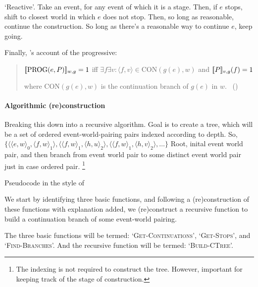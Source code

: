 \begin{note}
  `Reactive'.
  Take an event, for any event of which it is a stage.
  Then, if \(e\) stops, shift to closest world in which \(e\) does not stop.
  Then, so long as reasonable, continue the construction.
  So long as there's a reasonable way to continue \(e\), keep going.
\end{note}

\begin{note}
  Finally, \citeauthor{Landman:1992wh}'s account of the progressive:
  \begin{quote}
    \(\sem{\text{PROG}(e, P)}_{w,g} = 1\) iff \(\exists f \exists v\colon \langle f,v \rangle \in \text{CON}(g(e), w)\)\newline
    \phantom{an} and \(\sem{P}_{v,g}(f) = 1\)\par

    where \(\text{CON}(g(e), w)\) is the continuation branch of \(g(e)\) in \(w\).\newline
        \mbox{ }\hfill\mbox{(\citeyear[27]{Landman:1992wh})}
  \end{quote}
\end{note}

\paragraph{Algorithmic (re)construction}

\begin{note}
  Breaking this down into a recursive algorithm.
  Goal is to create a tree, which will be a set of ordered event-world-pairing pairs indexed according to depth.
  So, \(\{\langle \langle e,w \rangle_{0}, \langle f,w \rangle_{1} \rangle, \langle \langle f,w \rangle_{1}, \langle h,u \rangle_{2} \rangle, \langle \langle f,w \rangle_{1}, \langle h,v \rangle_{2} \rangle, \dots \}\)
  Root, inital event world pair, and then branch from event world pair to some distinct event world pair just in case ordered pair.
  \footnote{
    The indexing is not required to construct the tree.
    However, important for keeping track of the stage of construction.
  }

  Pseudocode in the style of ~\textcite{Cormen:2009uw}

  We start by identifying three basic functions, and following a (re)construction of these functions with explanation added, we (re)construct a recursive function to build a continuation branch of some event-world pairing.

  The three basic functions will be termed:
  `\textsc{Get-Continuations}', `\textsc{Get-Stops}', and `\textsc{Find-Branches}'.
  And the recursive function will be termed:
  `\textsc{Build-CTree}'.
\end{note}

